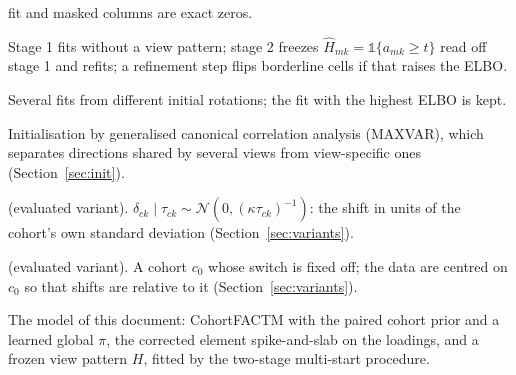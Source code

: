 \documentclass[11pt,a4paper]{article}
\newcommand{\N}{\mathcal{N}}
\theoremstyle{definition}
\theoremstyle{remark}
\begin{document}
\begin{description}[leftmargin=0pt,itemsep=3pt]
  fit and masked columns are exact zeros.
\item[Two-stage fit.] Stage 1 fits without a view pattern; stage 2 freezes $\hat H_{mk}=\mathbb 1\{a_{mk}\ge t\}$ read off
  stage 1 and refits; a refinement step flips borderline cells if that raises the ELBO.
\item[Multi-start.] Several fits from different initial rotations; the fit with the highest ELBO is kept.
\item[gCCA start.] Initialisation by generalised canonical correlation analysis (MAXVAR), which separates directions
  shared by several views from view-specific ones (Section~\ref{sec:init}).
\item[Scale-free shift prior] (evaluated variant). $\delta_{ck}\mid\tau_{ck}\sim\N(0,(\kappa\tau_{ck})^{-1})$: the shift in units of
  the cohort's own standard deviation (Section~\ref{sec:variants}).
\item[Reference cohort] (evaluated variant). A cohort $c_0$ whose switch is fixed off; the data are centred on $c_0$ so
  that shifts are relative to it (Section~\ref{sec:variants}).
\item[SP-CohortFACTM.] The model of this document: CohortFACTM with the paired cohort prior and a learned global
  $\pi$, the corrected element spike-and-slab on the loadings, and a frozen view pattern $H$, fitted by the two-stage
  multi-start procedure.
\end{description}

\end{document}
